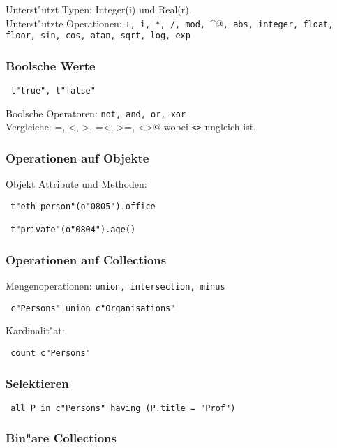\documentclass[german, 10pt, a4paper, twocolumn]{scrartcl}
\theoremstyle{definition}
\theoremstyle{remark}
\theoremstyle{example}
\begin{document}
Unterst"utzt Typen: Integer(i) und Real(r).\\

Unterst"utzte Operationen: \texttt{+, i, *, /, mod, }\verb@^@\texttt{, abs, integer, float, floor, sin, cos, atan, sqrt, log, exp}

\subsubsection{Boolsche Werte}

\begin{verbatim}
 l"true", l"false"
\end{verbatim}

Boolsche Operatoren: \texttt{not, and, or, xor}\\

Vergleiche: \verb@=, <, >, =<, >=, <>@ wobei \texttt{<>} ungleich ist.

\subsubsection{Operationen auf Objekte}

Objekt Attribute und Methoden:
\begin{verbatim}
 t"eth_person"(o"0805").office
 
 t"private"(o"0804").age()
\end{verbatim}

\subsubsection{Operationen auf Collections}

Mengenoperationen: \texttt{union, intersection, minus}
\begin{verbatim}
 c"Persons" union c"Organisations"
\end{verbatim}

Kardinalit"at:
\begin{verbatim}
 count c"Persons"
\end{verbatim}

\subsubsection{Selektieren}

\begin{verbatim}
 all P in c"Persons" having (P.title = "Prof")
\end{verbatim}

\subsubsection{Bin"are Collections}
\end{document}
